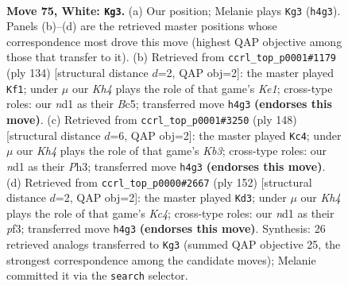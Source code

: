 \documentclass[11pt]{article}
\begin{document}
\clearpage

\begin{figure}[p]\centering
\begin{subfigure}{0.46\textwidth}\centering
\resizebox{\linewidth}{!}{%
\newchessgame
\chessboard[
  setfen={7k/8/P3b3/1P6/7K/8/8/3n4 w - - 3 75},
  showmover=false,
  pgfstyle=straightmove, color=movearrow, markmove={h4-g3}
]}
\caption{}
\end{subfigure}\hfill
\begin{subfigure}{0.46\textwidth}\centering
\resizebox{\linewidth}{!}{%
\newchessgame
\chessboard[
  setfen={8/8/5k2/2B5/8/1P3b2/P7/4K3 w - - 9 68},
  showmover=false,
  pgfstyle=straightmove, color=movearrow, markmove={e1-f1}
]}
\caption{}
\end{subfigure}
\\[4pt]
\begin{subfigure}{0.46\textwidth}\centering
\resizebox{\linewidth}{!}{%
\newchessgame
\chessboard[
  setfen={5b2/8/8/7P/4k1P1/1K5P/8/8 w - - 7 75},
  showmover=false,
  pgfstyle=straightmove, color=movearrow, markmove={b3-c4}
]}
\caption{}
\end{subfigure}\hfill
\begin{subfigure}{0.46\textwidth}\centering
\resizebox{\linewidth}{!}{%
\newchessgame
\chessboard[
  setfen={8/8/1P6/P3b1k1/2K5/5p2/8/8 w - - 0 77},
  showmover=false,
  pgfstyle=straightmove, color=movearrow, markmove={c4-d3}
]}
\caption{}
\end{subfigure}
\caption{\textbf{Move 75, White: \texttt{Kg3}.} (a) Our position; Melanie plays \texttt{Kg3} (\texttt{h4g3}). Panels (b)--(d) are the retrieved master positions whose correspondence most drove this move (highest QAP objective among those that transfer to it). (b) Retrieved from \texttt{ccrl\_top\_p0001\#1179} (ply 134) [structural distance $d$=2, QAP obj=2]: the master played \texttt{Kf1}; under $\mu$ our \emph{Kh4} plays the role of that game's \emph{Ke1}; cross-type roles: our \emph{n}d1 as their \emph{B}c5; transferred move \texttt{h4g3} \textbf{(endorses this move)}. (c) Retrieved from \texttt{ccrl\_top\_p0001\#3250} (ply 148) [structural distance $d$=6, QAP obj=2]: the master played \texttt{Kc4}; under $\mu$ our \emph{Kh4} plays the role of that game's \emph{Kb3}; cross-type roles: our \emph{n}d1 as their \emph{P}h3; transferred move \texttt{h4g3} \textbf{(endorses this move)}. (d) Retrieved from \texttt{ccrl\_top\_p0000\#2667} (ply 152) [structural distance $d$=2, QAP obj=2]: the master played \texttt{Kd3}; under $\mu$ our \emph{Kh4} plays the role of that game's \emph{Kc4}; cross-type roles: our \emph{n}d1 as their \emph{p}f3; transferred move \texttt{h4g3} \textbf{(endorses this move)}. Synthesis: 26 retrieved analogs transferred to \texttt{Kg3} (summed QAP objective 25, the strongest correspondence among the candidate moves); Melanie committed it via the \texttt{search} selector.}
\label{fig:thought-m148}
\end{figure}
\end{document}
